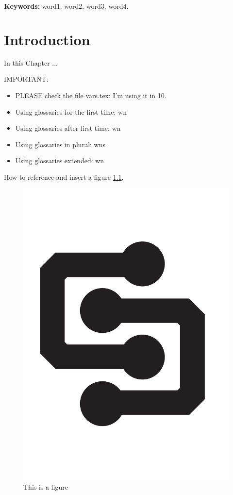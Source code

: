 \documentclass[11pt,a4paper]{report}
\begin{document}
\textbf{Keywords:} word1. word2. word3. word4.

\tableofcontents
\glsaddall
\printglossary[type=\acronymtype]
\printglossary[type=main,title={Glossary},toctitle={Glossary}]

\chapter{Introduction}
\label{chap:introduction}

In this Chapter ...

IMPORTANT:
\begin{itemize}
    \item PLEASE check the file vars.tex: I'm using it in 10\kbps.
    \item Using glossaries for the first time: \gls{wn}
    \item Using glossaries after first time: \gls{wn}
    \item Using glossaries in plural: \glspl{wn}
    \item Using glossaries extended: \glsdesc{wn}
\end{itemize}

How to reference and insert a figure \ref{fig:labeloffigure}.

\begin{figure}[ht]
    \centering
    \includegraphics[scale=0.2]{figs/MCiber-logo.pdf}
    \caption{This is a figure}
    \label{fig:labeloffigure}
\end{figure}
\end{document}
